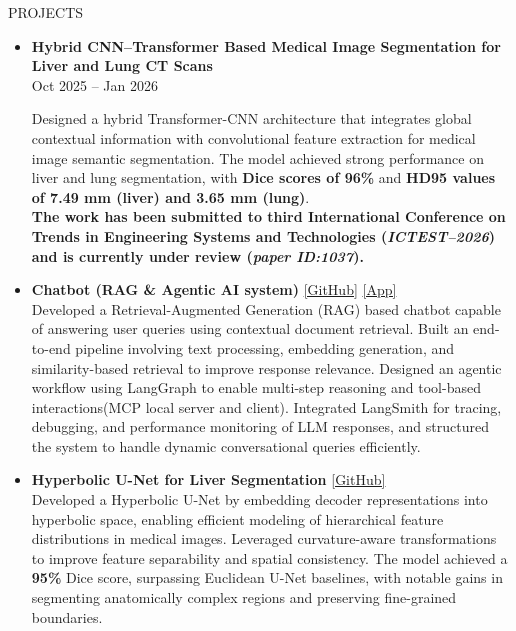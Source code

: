 \documentclass{resume}
\begin{document}
\begin{rSection}{PROJECTS}

\begin{itemize}
\itemsep -6pt

\item \textbf{Hybrid CNN--Transformer Based Medical Image Segmentation for Liver and Lung CT Scans}  \\ Oct 2025 -- Jan 2026

Designed a hybrid Transformer-CNN architecture that integrates global contextual information with convolutional feature extraction for medical image semantic segmentation. The model achieved strong performance on liver and lung segmentation, with \textbf{Dice scores of 96\%} and \textbf{HD95 values of 7.49 mm (liver) and 3.65 mm (lung)}. \\
\textbf{The work has been submitted to third International Conference on Trends in
Engineering Systems and Technologies (\textit{ICTEST--2026}) and is currently under review (\textit{paper ID:1037}).}
\item \textbf{Chatbot (RAG \& Agentic AI system)}
\hfill\href{https://github.com/thanuja-bobbepalli/Chatbot}{[GitHub]} \href{https://tha789-chatbot.streamlit.app/}{[App]} \\
Developed a Retrieval-Augmented Generation (RAG) based chatbot capable of answering user queries using contextual document retrieval. Built an end-to-end pipeline involving text processing, embedding generation, and similarity-based retrieval to improve response relevance. Designed an agentic workflow using LangGraph to enable multi-step reasoning and tool-based interactions(MCP local server and client). Integrated LangSmith for tracing, debugging, and performance monitoring of LLM responses, and structured the system to handle dynamic conversational queries efficiently.

\item \textbf{Hyperbolic U-Net for Liver Segmentation} \hfill \href{https://github.com/ai-mlclub-ece/Hyperbolic-Multi-Organ-Segmentation}{[GitHub]}   \\
Developed a Hyperbolic U-Net by embedding decoder representations into hyperbolic space, enabling efficient modeling of hierarchical feature distributions in medical images. Leveraged curvature-aware transformations to improve feature separability and spatial consistency. The model achieved a \textbf{ 95\% } Dice score, surpassing Euclidean U-Net baselines, with notable gains in segmenting anatomically complex regions and preserving fine-grained boundaries.


\end{itemize}
\end{rSection}
\end{document}
